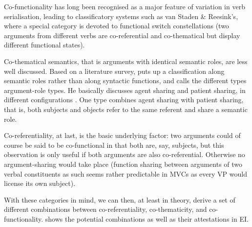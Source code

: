 Co-functionality has long been recognised as a major feature of variation in verb serialisation, leading to classificatory systems such as van Staden \& Reesink's, where a special category is devoted to functional switch constellations (two arguments from different verbs are co-referential and co-thematical but display different functional states). 

Co-thematical semantics, that is arguments with identical semantic roles, are less well discussed. Based on a literature survey, \citet{haspelmath2016serial} puts up a classification along semantic roles rather than along syntactic functions, and calls the different types argument-role types. He basically discusses agent sharing and patient sharing, in different configurations \citep[3ff.]{haspelmath2016serial}. One type combines agent sharing with patient sharing, that is, both subjects and objects refer to the same referent and share a semantic role.

Co-referentiality, at last, is the basic underlying factor: two arguments could of course be said to be co-functional in that both are, say, subjects, but this observation is only useful if both arguments are also co-referential. Otherwise no argument-sharing would take place (function sharing between arguments of two verbal constituents as such seems rather predictable in MVCs as every VP would license its own subject). 

With these categories in mind, we can then, at least in theory, derive a set of different combinations between co-referentiality, co-thematicity, and co-func\-tion\-al\-i\-ty.  shows the potential combinations as well as their attestations in EI.

\begin{table}
\caption[Combination types of semantic role and syntactic function in shared MVC arguments]{Combination types of semantic role and syntactic function in shared MVC arguments.}
\label{table:Combination_role-function}
\end{table}

